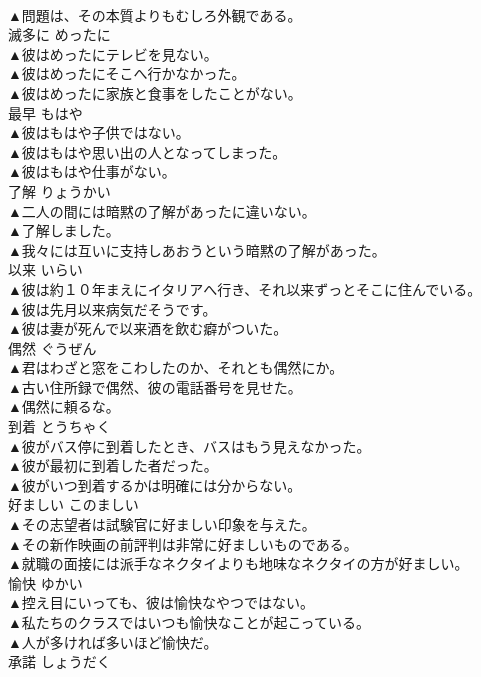 \documentclass[8pt]{extreport}
\begin{document}
\begin{CJK}{UTF8}{min}
\\	▲問題は、その本質よりもむしろ外観である。 
\\	滅多に	めったに	
\\	▲彼はめったにテレビを見ない。 
\\	▲彼はめったにそこへ行かなかった。 
\\	▲彼はめったに家族と食事をしたことがない。 
\\	最早	もはや	
\\	▲彼はもはや子供ではない。 
\\	▲彼はもはや思い出の人となってしまった。 
\\	▲彼はもはや仕事がない。 
\\	了解	りょうかい	
\\	▲二人の間には暗黙の了解があったに違いない。 
\\	▲了解しました。 
\\	▲我々には互いに支持しあおうという暗黙の了解があった。 
\\	以来	いらい	
\\	▲彼は約１０年まえにイタリアへ行き、それ以来ずっとそこに住んでいる。 
\\	▲彼は先月以来病気だそうです。 
\\	▲彼は妻が死んで以来酒を飲む癖がついた。 
\\	偶然	ぐうぜん	
\\	▲君はわざと窓をこわしたのか、それとも偶然にか。 
\\	▲古い住所録で偶然、彼の電話番号を見せた。 
\\	▲偶然に頼るな。 
\\	到着	とうちゃく	
\\	▲彼がバス停に到着したとき、バスはもう見えなかった。 
\\	▲彼が最初に到着した者だった。 
\\	▲彼がいつ到着するかは明確には分からない。 
\\	好ましい	このましい	
\\	▲その志望者は試験官に好ましい印象を与えた。 
\\	▲その新作映画の前評判は非常に好ましいものである。 
\\	▲就職の面接には派手なネクタイよりも地味なネクタイの方が好ましい。 
\\	愉快	ゆかい	
\\	▲控え目にいっても、彼は愉快なやつではない。 
\\	▲私たちのクラスではいつも愉快なことが起こっている。 
\\	▲人が多ければ多いほど愉快だ。 
\\	承諾	しょうだく	

\end{CJK}
\end{document}
